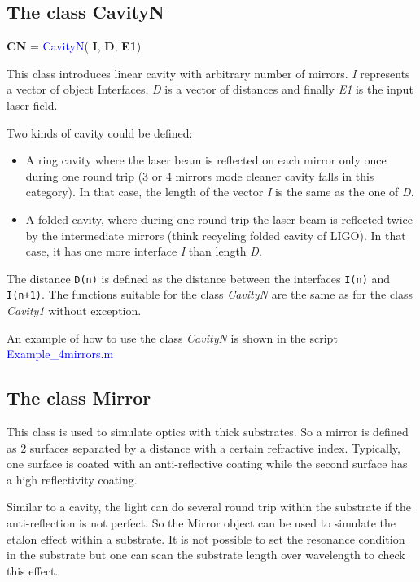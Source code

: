\subsection{The class CavityN}

\textbf{CN} = \textcolor{blue}{CavityN}( \textbf{I}, \textbf{D}, \textbf{E1})

This class introduces linear cavity with arbitrary number of mirrors. \textsl{I} represents a vector of object Interfaces, \textsl{D} is a vector of distances and finally \textsl{E1} is the input laser field.

Two kinds of cavity could be defined:
\begin{itemize}
  \item A ring cavity where the laser beam is reflected on each mirror only once during one round trip (3 or 4 mirrors mode cleaner cavity falls in this category). In that case, the length of the vector \textsl{I} is the same as the one of \textsl{D}.
  \item A folded cavity, where during one round trip the laser beam is reflected twice by the intermediate mirrors (think recycling folded cavity of LIGO). In that case, it has one more interface \textsl{I} than length \textsl{D}.
\end{itemize}


The distance  \verb|D(n)| is defined as the distance between the interfaces  \verb|I(n)| and  \verb|I(n+1)|. The functions suitable for the class \textsl{CavityN} are the same as for the class \textsl{Cavity1} without exception.

An example of how to use the class \textsl{CavityN} is shown in the script \textcolor{blue}{Example\_4mirrors.m}

\subsection{The class Mirror}

This class is used to simulate optics with thick substrates. So a mirror is defined as 2 surfaces separated by a distance with a certain refractive index. Typically, one surface is coated with an anti-reflective coating while the second surface has a high reflectivity coating.

Similar to a cavity, the light can do several round trip within the substrate if the anti-reflection is not perfect. So the Mirror object can be used to simulate the etalon effect within a substrate. It is not possible to set the resonance condition in the substrate but one can scan the substrate length over wavelength to check this effect.

